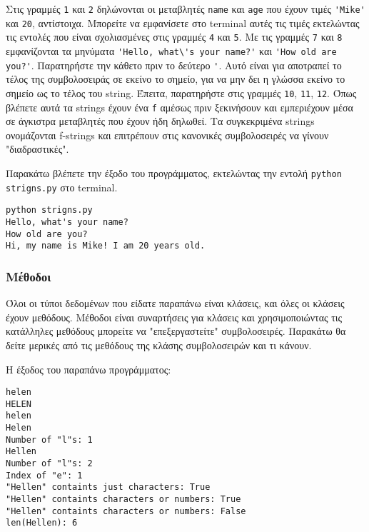\documentclass[12pt]{extreport}
\begin{document}


Στις γραμμές \lstinline{1} και \lstinline{2} δηλώνονται οι μεταβλητές \lstinline{name} και \lstinline{age} που έχουν τιμές \lstinline{'Mike'} και \lstinline{20}, αντίστοιχα. Μπορείτε να εμφανίσετε στο terminal αυτές τις τιμές εκτελώντας τις εντολές που είναι σχολιασμένες στις γραμμές \lstinline{4} και \lstinline{5}. Με τις γραμμές \lstinline{7} και \lstinline{8} εμφανίζονται τα μηνύματα \lstinline{'Hello, what\'s your name?'} και \lstinline{'How old are you?'}. Παρατηρήστε την κάθετο πριν το δεύτερο \lstinline{'}. Αυτό είναι για αποτραπεί το τέλος της συμβολοσειράς σε εκείνο το σημείο, για να μην δει η γλώσσα εκείνο το σημείο ως το τέλος του string. Έπειτα, παρατηρήστε στις γραμμές \lstinline{10}, \lstinline{11}, \lstinline{12}. Όπως βλέπετε αυτά τα strings έχουν ένα \lstinline{f} αμέσως πριν ξεκινήσουν και εμπεριέχουν μέσα σε άγκιστρα μεταβλητές που έχουν ήδη δηλωθεί. Τα συγκεκριμένα strings ονομάζονται f-strings και επιτρέπουν στις κανονικές συμβολοσειρές να γίνουν "διαδραστικές". 

Παρακάτω βλέπετε την έξοδο του προγράμματος, εκτελώντας την εντολή \lstinline{python strigns.py} στο terminal.

\begin{lstlisting}[language={}]
python strigns.py
Hello, what's your name?
How old are you?
Hi, my name is Mike! I am 20 years old.
\end{lstlisting}

\subsubsection{Μέθοδοι}

Όλοι οι τύποι δεδομένων που είδατε παραπάνω είναι κλάσεις, και όλες οι κλάσεις έχουν μεθόδους. Μέθοδοι είναι συναρτήσεις για κλάσεις και χρησιμοποιώντας τις κατάλληλες μεθόδους μπορείτε να "επεξεργαστείτε" συμβολοσειρές. Παρακάτω θα δείτε μερικές από τις μεθόδους της κλάσης συμβολοσειρών και τι κάνουν.




Η έξοδος του παραπάνω προγράμματος:

\begin{lstlisting}[language={}]
helen
HELEN
helen
Helen
Number of "l"s: 1
Hellen
Number of "l"s: 2
Index of "e": 1
"Hellen" containts just characters: True
"Hellen" containts characters or numbers: True
"Hellen" containts characters or numbers: False
len(Hellen): 6
\end{lstlisting}
\end{document}
